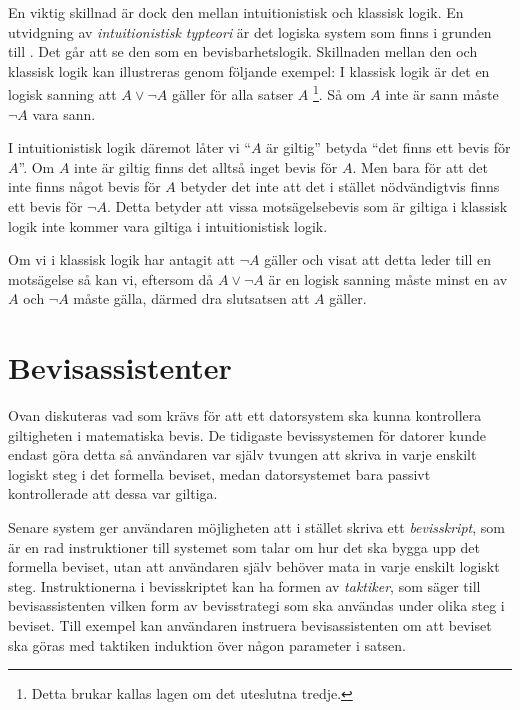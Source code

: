 En viktig skillnad är dock den mellan intuitionistisk och klassisk logik. En
utvidgning av \emph{intuitionistisk typteori}\cite{martin1984intuitionistic} är
det logiska system som finns i grunden till \coq{}\cite{bertot2004interactive}.
Det går att se den som en bevisbarhetslogik. Skillnaden mellan den och klassisk
logik kan illustreras genom följande exempel: I klassisk logik är det en logisk
sanning att $A \lor \neg A$ gäller för alla satser $A$ \footnote{Detta brukar
kallas lagen om det uteslutna tredje.}. Så om $A$ inte är sann måste $\neg A$
vara sann\cite{bennet2004forsta}.

I intuitionistisk logik däremot låter vi ``$A$ är giltig'' betyda ``det finns
ett bevis för $A$''. Om $A$ inte är giltig finns det alltså inget bevis för
$A$. Men bara för att det inte finns något bevis för $A$ betyder det inte att
det i stället nödvändigtvis finns ett bevis för $\neg A$. Detta betyder att
vissa motsägelsebevis som är giltiga i klassisk logik inte kommer vara giltiga
i intuitionistisk logik\cite{barendregt2001proofdependent}.

Om vi i klassisk logik har antagit att $\neg A$ gäller och visat att detta
leder till en motsägelse så kan vi, eftersom då $A \lor \neg A$ är en logisk
sanning måste minst en av $A$ och $\neg A$ måste gälla, därmed dra slutsatsen
att $A$ gäller.

\section{Bevisassistenter}
Ovan diskuteras vad som krävs för att ett datorsystem ska kunna kontrollera
giltigheten i matematiska bevis. De tidigaste bevissystemen för datorer kunde
endast göra detta så användaren var själv tvungen att skriva in varje enskilt
logiskt steg i det formella beviset, medan datorsystemet bara passivt
kontrollerade att dessa var giltiga.

Senare system ger användaren möjligheten att i stället skriva ett
\emph{bevisskript}, som är en rad instruktioner till systemet som talar om hur
det ska bygga upp det formella beviset, utan att användaren själv behöver mata
in varje enskilt logiskt steg.
Instruktionerna i bevisskriptet kan ha formen av \emph{taktiker}, som säger till
bevisassistenten vilken form av bevisstrategi som ska användas under olika steg
i beviset. Till exempel kan användaren instruera bevisassistenten om att
beviset ska göras med taktiken induktion över någon parameter i satsen.

